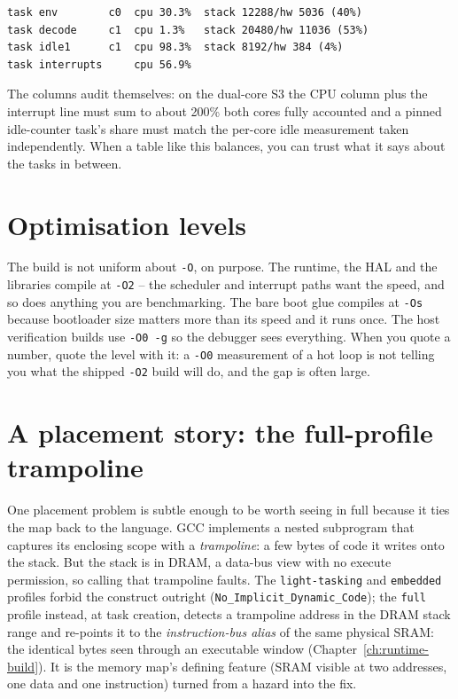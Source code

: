 \begin{lstlisting}[style=sh]
task env        c0  cpu 30.3%  stack 12288/hw 5036 (40%)
task decode     c1  cpu 1.3%   stack 20480/hw 11036 (53%)
task idle1      c1  cpu 98.3%  stack 8192/hw 384 (4%)
task interrupts     cpu 56.9%
\end{lstlisting}

The columns audit themselves: on the dual-core S3 the CPU column plus the
interrupt line must sum to about 200\% \textemdash{} both cores fully
accounted \textemdash{} and a pinned idle-counter task's share must match the
per-core idle measurement taken independently.  When a table like this
balances, you can trust what it says about the tasks in between.

\section{Optimisation levels}

The build is not uniform about \texttt{-O}, on purpose. The runtime, the HAL and the
libraries compile at \texttt{-O2} -- the scheduler and interrupt paths want the speed,
and so does anything you are benchmarking. The bare boot glue compiles at
\texttt{-Os} because bootloader size matters more than its speed and it runs once.
The host verification builds use \texttt{-O0 -g} so the debugger sees everything.
When you quote a number, quote the level with it: a \texttt{-O0} measurement of a
hot loop is not telling you what the shipped \texttt{-O2} build will do, and the gap
is often large.

\section{A placement story: the full-profile trampoline}

One placement problem is subtle enough to be worth seeing in full because it ties
the map back to the language. GCC implements a nested subprogram that captures its
enclosing scope with a \emph{trampoline}: a few bytes of code it writes onto the
stack. But the stack is in DRAM, a data-bus view with no execute permission, so
calling that trampoline faults. The \texttt{light-tasking} and \texttt{embedded}
profiles forbid the construct outright (\texttt{No\_Implicit\_Dynamic\_Code}); the
\texttt{full} profile instead, at task creation, detects a trampoline address in the
DRAM stack range and re-points it to the \emph{instruction-bus alias} of the same
physical SRAM: the identical bytes seen through an executable window
(Chapter~\ref{ch:runtime-build}). It is the memory map's defining feature (SRAM
visible at two addresses, one data and one instruction) turned from a hazard into
the fix.
